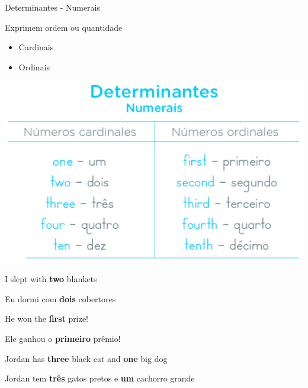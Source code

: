 \documentclass[compress,mathserif,xcolor=table]{beamer}
\begin{document}
\begin{frame}{Determinantes - Numerais}

\begin{minipage}{.49\textwidth}
Exprimem ordem ou quantidade
\begin{itemize}
    \item Cardinais
    \item Ordinais
\end{itemize}
\end{minipage}
\begin{minipage}{.49\textwidth}
\includegraphics[width=\linewidth]{images/determinantes_numerais.png}
\end{minipage}

\vspace{0.5cm}

I slept with \textbf{two} blankets

Eu dormi com \textbf{dois} cobertores

\vspace{0.15cm}

He won the \textbf{first} prize!

Ele ganhou o \textbf{primeiro} prêmio!

\vspace{0.15cm}

Jordan has \textbf{three} black cat and \textbf{one} big dog 

Jordan tem \textbf{três} gatos pretos e \textbf{um} cachorro grande

\end{frame}

\end{document}
